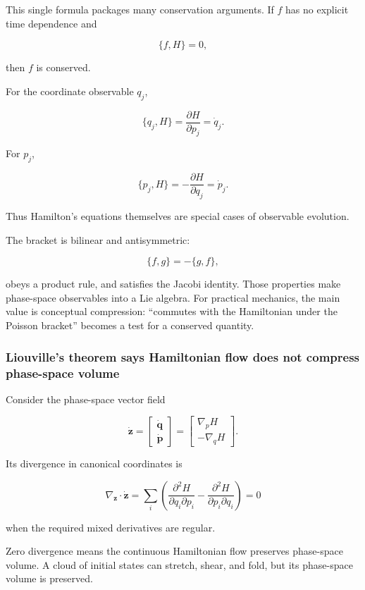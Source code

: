 This single formula packages many conservation arguments. If \(f\) has no explicit time dependence and

\[
\{f,H\}=0,
\]

then \(f\) is conserved.

For the coordinate observable \(q_j\),

\[
\{q_j,H\}
=
\frac{\partial H}{\partial p_j}
=
\dot q_j.
\]

For \(p_j\),

\[
\{p_j,H\}
=
-
\frac{\partial H}{\partial q_j}
=
\dot p_j.
\]

Thus Hamilton's equations themselves are special cases of observable evolution.

The bracket is bilinear and antisymmetric:

\[
\{f,g\}=-\{g,f\},
\]

obeys a product rule, and satisfies the Jacobi identity. Those properties make phase-space observables into a Lie algebra. For practical mechanics, the main value is conceptual compression: ``commutes with the Hamiltonian under the Poisson bracket'' becomes a test for a conserved quantity.

\subsubsection{Liouville's theorem says Hamiltonian flow does not compress phase-space volume}\label{02-foundations-ii-ch025-liouvilles-theorem-says-hamiltonian-flow-does-not-compress-phase-space-volume}

Consider the phase-space vector field

\[
\dot{\mathbf z}
=
\begin{bmatrix}
\dot{\mathbf q}\\
\dot{\mathbf p}
\end{bmatrix}
=
\begin{bmatrix}
\nabla_pH\\
-\nabla_qH
\end{bmatrix}.
\]

Its divergence in canonical coordinates is

\[
\nabla_{\mathbf z}\cdot\dot{\mathbf z}
=
\sum_i
\left(
\frac{\partial^2H}{\partial q_i\partial p_i}
-
\frac{\partial^2H}{\partial p_i\partial q_i}
\right)
=0
\]

when the required mixed derivatives are regular.

Zero divergence means the continuous Hamiltonian flow preserves phase-space volume. A cloud of initial states can stretch, shear, and fold, but its phase-space volume is preserved.

